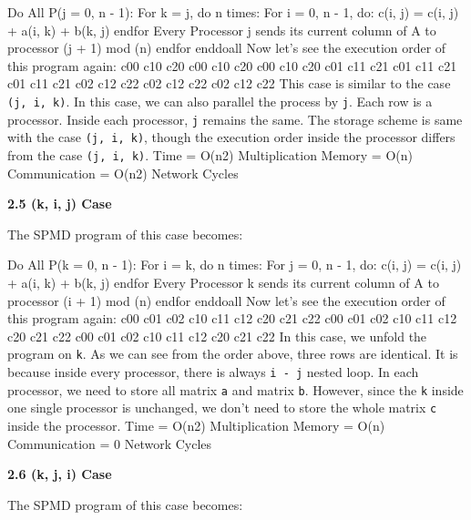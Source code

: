 \documentclass{article}%
\newenvironment{code}%
   {\snugshade\verbatim}%
   {\endverbatim\endsnugshade}
\begin{document}
\begin{Large}
\begin{code}
    Do All P(j = 0, n - 1):
        For k = j, do n times:
            For i = 0, n - 1, do:
                c(i, j) = c(i, j) + a(i, k) + b(k, j)
            endfor
        Every Processor j sends its current 
        column of A to processor (j + 1) mod (n)
        endfor
    enddoall
\end{code}
\newpage
Now let's see the execution order of this program again:
\begin{code}
    c00 c10 c20 c00 c10 c20 c00 c10 c20 
    c01 c11 c21 c01 c11 c21 c01 c11 c21
    c02 c12 c22 c02 c12 c22 c02 c12 c22
\end{code}
This case is similar to the case \texttt{(j, i, k)}. In this case, we can also parallel the process by \texttt{j}. Each row is a processor. Inside each processor, \texttt{j} remains the same. The storage scheme is same with the case \texttt{(j, i, k)}, though the execution order inside the processor differs from the case \texttt{(j, i, k)}.
\begin{code}
Time = O(n2) Multiplication
Memory = O(n)
Communication = O(n2) Network Cycles
\end{code}
\begin{LARGE}
\begin{flushleft}
\textbf{2.5 (k, i, j) Case}
\end{flushleft}
\end{LARGE}
The SPMD program of this case becomes:

\begin{code}
    Do All P(k = 0, n - 1):
        For i = k, do n times:
            For j = 0, n - 1, do:
                c(i, j) = c(i, j) + a(i, k) + b(k, j)
            endfor
        Every Processor k sends its current 
        column of A to processor (i + 1) mod (n)
        endfor
    enddoall
\end{code}
Now let's see the execution order of this program again:
\begin{code}
    c00 c01 c02 c10 c11 c12 c20 c21 c22 
    c00 c01 c02 c10 c11 c12 c20 c21 c22
    c00 c01 c02 c10 c11 c12 c20 c21 c22
\end{code}
In this case, we unfold the program on \texttt{k}. As we can see from the order above, three rows are identical. It is because inside every processor, there is always \texttt{i - j} nested loop. In each processor, we need to store all matrix \texttt{a} and matrix \texttt{b}. However, since the \texttt{k} inside one single processor is unchanged, we don't need to store the whole matrix \texttt{c} inside the processor.
\newpage
\begin{code}
Time = O(n2) Multiplication
Memory = O(n)
Communication = 0 Network Cycles
\end{code}
\begin{LARGE}
\begin{flushleft}
\textbf{2.6 (k, j, i) Case}
\end{flushleft}
\end{LARGE}
The SPMD program of this case becomes:


\end{Large}
\end{document}
